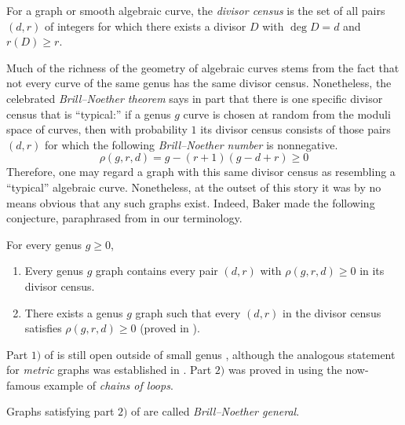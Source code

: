 \begin{defi}
For a graph or smooth algebraic curve, the \emph{divisor census} is the set of all pairs $(d,r)$ of integers for which there exists a divisor $D$ with $\deg D = d$ and $r(D) \geq r$.
\end{defi}

Much of the richness of the geometry of algebraic curves stems from the fact that not every curve of the same genus has the same divisor census. Nonetheless, the celebrated \emph{Brill--Noether theorem} \cite{gh80} says in part that there is one specific divisor census that is ``typical:'' if a genus $g$ curve is chosen at random from the moduli space of curves, then with probability $1$ its divisor census consists of those pairs $(d,r)$ for which the following \emph{Brill--Noether number} is nonnegative.
$$
\rho(g,r,d) = g - (r+1)(g-d+r) \geq 0
$$
Therefore, one may regard a graph with this same divisor census as resembling a ``typical'' algebraic curve. Nonetheless, at the outset of this story it was by no means obvious that any such graphs exist. Indeed, Baker made the following conjecture, paraphrased from \cite[Conjecture 3.9]{BakerSpec} in our terminology.

\begin{conjecture}
\label{conj:bn}
For every genus $g \geq 0$,
\begin{enumerate}[label = \arabic*)]
    \item Every genus $g$ graph contains every pair $(d,r)$ with $\rho(g,r,d) \geq 0$ in its divisor census.
    \item There exists a genus $g$ graph such that every $(d,r)$ in the divisor census satisfies $\rho(g,r,d) \geq 0$ (proved in \cite{CDPR12}).
\end{enumerate}
\end{conjecture}

Part $1)$ of  is still open outside of small genus \cite{atanasovRanganathan}, although the analogous statement for \emph{metric} graphs was established in \cite{BakerSpec}. Part $2)$ was proved in \cite{CDPR12} using the now-famous example of \emph{chains of loops}. 

\begin{defi}
Graphs satisfying part $2)$ of  are called \emph{Brill--Noether general}.
\end{defi}


